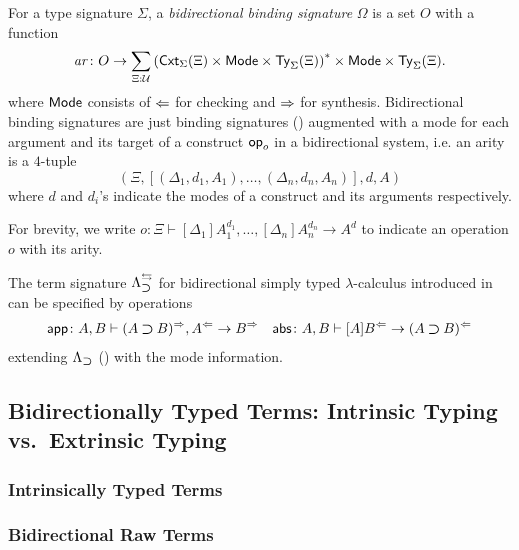 \documentclass[acmsmall,screen]{acmart}
\theoremstyle{acmdefinition}
\begin{document}
\begin{definition}
  For a type signature $\Sigma$, a \emph{bidirectional binding signature} $\Omega$ is a set $O$ with a function
  \[
    \mathit{ar}\colon O \to \sum_{\Xi : \mathcal{U}} \left(\mathsf{Cxt}_{\Sigma}(\Xi) \times \mathsf{Mode} \times \mathsf{Ty}_{\Sigma}(\Xi)\right)^* \times \mathsf{Mode} \times \mathsf{Ty}_{\Sigma}(\Xi).
  \]
  where $\mathsf{Mode}$ consists of $\Leftarrow$ for checking and $\Rightarrow$ for synthesis.
  Bidirectional binding signatures are just binding signatures () augmented with a mode for each argument and its target of a construct $\mathsf{op}_o$ in a bidirectional system, i.e.
  an arity is a $4$-tuple
  \[
    \left(\Xi, \left[\left(\Delta_1, d_1, A_1\right), \ldots, \left(\Delta_{n}, d_n, A_{n}\right) \right], d, A\right)
  \]
  where $d$ and $d_i$'s indicate the modes of a construct and its arguments respectively.

  For brevity, we write $o \colon \Xi \vdash [\Delta_1]A_{1}^{d_1}, \ldots, [\Delta_{n}] A^{d_n}_{n} \to A^{d}$ to indicate an operation $o$ with its arity. 
\end{definition}

\begin{example}
  The term signature $\Lambda_{\mathbin{\bm{\supset}}}^{\leftrightarrows}$ for bidirectional simply typed $\lambda$-calculus introduced in  can be specified by operations 
  \begin{align*}
    \mathsf{app}\colon A, B \vdash (A \mathbin{\bm{\supset}} B)^{\Rightarrow}, A^{\Leftarrow} \to B^{\Rightarrow} &&
    \mathsf{abs}\colon A , B \vdash [A]B^{\Leftarrow} \to (A \mathbin{\bm{\supset}} B)^{\Leftarrow}
  \end{align*}
  extending $\Lambda_{\mathbin{\bm{\supset}}}$ () with the mode information.
\end{example}

\subsection{Bidirectionally Typed Terms: Intrinsic Typing vs.\ Extrinsic Typing}

\subsubsection{Intrinsically Typed Terms}

\subsubsection{Bidirectional Raw Terms}
\end{document}
